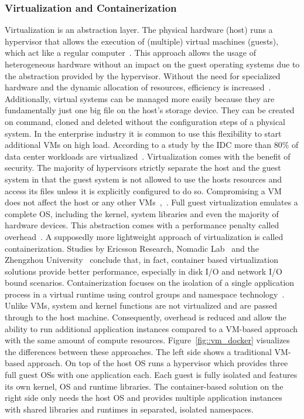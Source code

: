         \subsubsection{Virtualization and Containerization}\label{sssec::virtual}
        Virtualization is an abstraction layer. The physical hardware (host) runs a hypervisor that allows the execution of (multiple) virtual machines (guests), which act like a regular computer~\cite{vmbasics}. This approach allows the usage of heterogeneous hardware without an impact on the guest operating systems due to the abstraction provided by the hypervisor. Without the need for specialized hardware and the dynamic allocation of resources, efficiency is increased~\cite{redhat_venv}. Additionally, virtual systems can be managed more easily because they are fundamentally just one big file on the host's storage device. They can be created on command, cloned and deleted without the configuration steps of a physical system. In the enterprise industry it is common to use this flexibility to start additional \ac{VM}s on high load. According to a study by the \ac{IDC} more than 80\% of data center workloads are virtualized~\cite{virtualaddoption}. Virtualization comes with the benefit of security. The majority of hypervisors strictly separate the host and the guest system in that the guest system is not allowed to use the hosts resources and access its files unless it is explicitly configured to do so. Compromising a \ac{VM} does not affect the host or any other \ac{VM}s~\cite{vmbasics},~\cite{redhat_venv}.\newline
        Full guest virtualization emulates a complete \ac{OS}, including the kernel, system libraries and even the majority of hardware devices. This abstraction comes with a performance penalty called overhead~\cite{vmbasics}. A supposedly more lightweight approach of virtualization is called containerization. Studies by Ericsson Research, Nomadic Lab~\cite{ieee_perfomance} and the Zhengzhou University~\cite{zhengzhou_university} conclude that, in fact, container based virtualization solutions provide better performance, especially in disk \acs{I/O} and network \acs{I/O} bound scenarios. Containerization focuses on the isolation of a single application process in a virtual runtime using control groups and namespace technology~\cite{cgroups}. Unlike \ac{VM}s, system and kernel functions are not virtualized and are passed through to the host machine. Consequently, overhead is reduced and allow the ability to run additional application instances compared to a \ac{VM}-based approach with the same amount of compute resources. Figure~\ref{fig::vm_docker} visualizes the differences between these approaches. The left side shows a traditional \ac{VM}-based approach. On top of the host \ac{OS} runs a hypervisor which provides three full guest \acl{OS}s with one application each. Each guest is fully isolated and features its own kernel, \ac{OS} and runtime libraries. The container-based solution on the right side only needs the host \ac{OS} and provides multiple application instances with shared libraries and runtimes in separated, isolated namespaces.\newline
